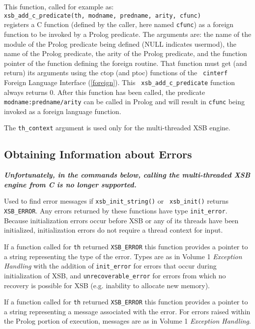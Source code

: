 \begin{description}
%
This function, called for example as: \\
{\tt xsb\_add\_c\_predicate(th, modname, predname, arity, cfunc)}\\
registers a C function (defined by the caller, here named {\tt cfunc})
as a foreign function to be invoked by a Prolog predicate.  The
arguments are: the name of the module of the Prolog predicate being
defined (NULL indicates usermod), the name of the Prolog predicate,
the arity of the Prolog predicate, and the function pointer of the
function defining the foreign routine.  That function must get (and
return) its arguments using the ctop (and ptoc) functions of the {\tt
  cinterf} Foreign Language Interface (\ref{foreign}).  This {\tt
  xsb\_add\_c\_predicate} function always returns 0.  After this
function has been called, the predicate {\tt modname:predname/arity}
can be called in Prolog and will result in {\tt cfunc} being invoked
as a foreign language function.

The {\tt th\_context} argument is used only for the multi-threaded XSB engine.

\end{description}

\subsection{Obtaining Information about Errors}
           {\bf {\em Unfortunately, in the commands below, calling the
               multi-threaded XSB engine from C is no longer
               supported.}}

\begin{description}
%
Used to find error messages if {\tt xsb\_init\_string()} or {\tt
  xsb\_init()} returns {\tt XSB\_ERROR}.  Any errors returned by these
functions have type {\tt init\_error}.  Because initialization errors
occur before XSB or any of its threads have been initialized,
initialization errors do not require a thread context for input.

%
If a function called for {\tt th} returned {\tt XSB\_ERROR} this
function provides a pointer to a string representing the type of the
error.  Types are as in Volume 1 {\em Exception Handling} with the
addition of {\tt init\_error} for errors that occur during
initialization of XSB, and {\tt unrecoverable\_error} for errors from
which no recovery is possible for XSB (e.g. inability to allocate new
memory).  

%
If a function called for {\tt th} returned {\tt XSB\_ERROR} this
function provides a pointer to a string representing a message
associated with the error.  For errors raised within the Prolog
portion of execution, messages are as in Volume 1 {\em Exception
  Handling}.

\end{description}

